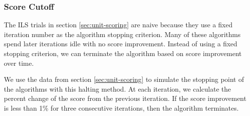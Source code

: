 \documentclass[11pt]{article}
\newcommand{\td}{\todo[inline]}
\begin{document}
%
%

\subsubsection{Score Cutoff}
The ILS trials in section \ref{sec:unit-scoring} are naive because they use a fixed iteration number as the algorithm stopping criterion. Many of these algorithms spend later iterations idle with no score improvement. Instead of using a fixed stopping criterion, we can terminate the algorithm based on score improvement over time. 

We use the data from section \ref{sec:unit-scoring} to simulate the stopping point of the algorithms with this halting method. At each iteration, we calculate the percent change of the score from the previous iteration. If the score improvement is less than 1\% for three consecutive iterations, then the algorithm terminates.    
\end{document}
